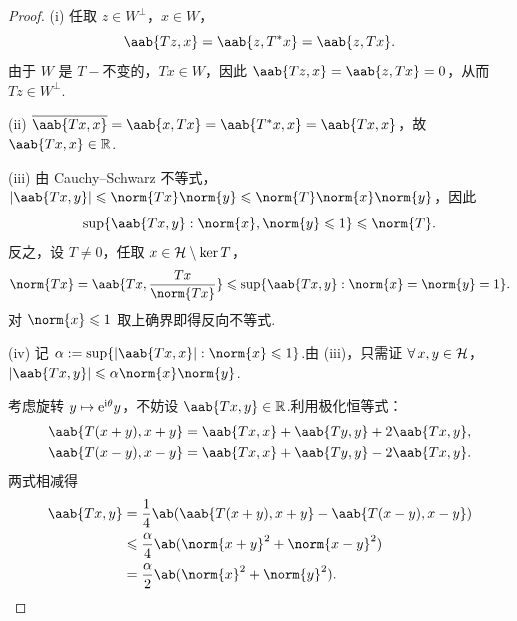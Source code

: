 \begin{proof}
(i) 任取 $z\in W^\perp$，$x\in W$，
\begin{equation*}
\aab{Tz, x} = \aab{z, T^*x} = \aab{z, Tx}.
\end{equation*}
由于 $W$ 是 $T-\!\!$不变的，$Tx\in W$，因此 $\aab{Tz, x} = \aab{z, Tx} = 0$，从而 $Tz\in W^\perp$.\par
(ii) $\overline{\aab{Tx, x}} = \aab{x, Tx} = \aab{T^*x, x} = \aab{Tx, x}$，故 $\aab{Tx, x}\in\mb{R}$.\par
(iii) 由 Cauchy--Schwarz 不等式，$|\aab{Tx, y}|\leq\norm{Tx}\norm{y}\leq\norm{T}\norm{x}\norm{y}$，因此
\begin{equation*}
\sup\{\aab{Tx, y}: \norm{x},\norm{y}\leq 1\}\leq\norm{T}.
\end{equation*}
反之，设 $T\neq0$，任取 $x\in\mathcal{H}\setminus\ker T$，
\begin{equation*}
\norm{Tx} = \aab{Tx, \frac{Tx}{\norm{Tx}}} \leq \sup\{\aab{Tx, y}: \norm{x}=\norm{y}=1\}.
\end{equation*}
对 $\norm{x}\leq1$ 取上确界即得反向不等式.\par
(iv) 记 $\alpha := \sup\{|\aab{Tx, x}|: \norm{x}\leq 1\}$.由 (iii)，只需证 $\forall\,x,y\in\mathcal{H}$，$|\aab{Tx, y}|\leq\alpha\norm{x}\norm{y}$.\par
考虑旋转 $y\mapsto \mathrm{e}^{\mathrm{i}\theta}y$，不妨设 $\aab{Tx, y}\in\mb{R}$.利用极化恒等式：
\begin{align*}
\aab{T(x+y), x+y} &= \aab{Tx, x} + \aab{Ty, y} + 2\aab{Tx, y},\\
\aab{T(x-y), x-y} &= \aab{Tx, x} + \aab{Ty, y} - 2\aab{Tx, y}.
\end{align*}
两式相减得
\begin{align*}
\aab{Tx, y} &= \frac{1}{4}\ab(\aab{T(x+y), x+y} - \aab{T(x-y), x-y})\\
&\leq \frac{\alpha}{4}\ab(\norm{x+y}^2 + \norm{x-y}^2)\\
&= \frac{\alpha}{2}\ab(\norm{x}^2 + \norm{y}^2).
\end{align*}


\end{proof}
